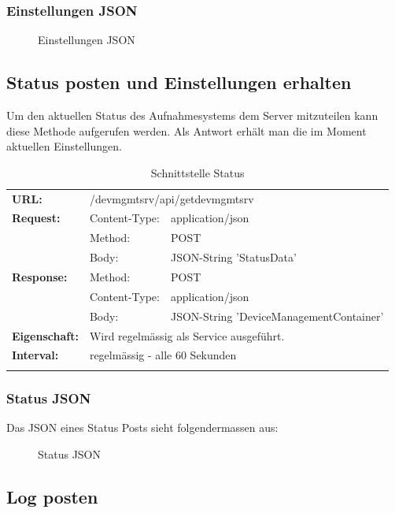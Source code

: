 \subsubsection{Einstellungen JSON}
\begin{figure}[H]
	\centering
	
	\caption{Einstellungen JSON}
\end{figure}

\subsection{Status posten und Einstellungen erhalten}

Um den aktuellen Status des Aufnahmesystems dem Server mitzuteilen kann diese Methode aufgerufen werden. Als Antwort erhält man die im Moment aktuellen Einstellungen.

{\renewcommand{\arraystretch}{1}
    \begin{longtable}{ p{2.5cm} p{3.5cm} p{6cm}} 
	\textbf{URL:} & \multicolumn{2}{l}{/devmgmtsrv/api/getdevmgmtsrv} \\
	\textbf{Request:} & Content-Type: & application/json \\
		& Method: & POST \\
		& Body: & JSON-String 'StatusData' \\
	\textbf{Response:} & Method: & POST \\
		& Content-Type: & application/json \\
		& Body: & JSON-String 'DeviceManagementContainer' \\
	\textbf{Eigenschaft:} & \multicolumn{2}{p{10cm}}{Wird regelmässig als Service ausgeführt.} \\ 
	\textbf{Interval:} & \multicolumn{2}{p{10cm}}{regelmässig - alle 60 Sekunden} \\
	
\caption{Schnittstelle Status}
\end{longtable}	}
\subsubsection{Status JSON}

Das JSON eines Status Posts sieht folgendermassen aus:

\begin{figure}[H]
	\centering
	
	\caption{Status JSON}
\end{figure}


\subsection{Log posten}

